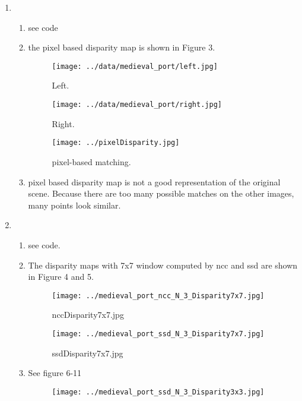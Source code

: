 \documentclass[a4paper, twoside, english]{article}
\begin{document}
\begin{enumerate}
	\item 
	\begin{enumerate}
		\item see code
		\item the pixel based disparity map is shown in Figure 3.
			\begin{figure}[h!]
			\begin{minipage}[b]{0.3\textwidth}
				\texttt{[image: ../data/medieval\_port/left.jpg]}
				\caption{Left.}
			\end{minipage}
			\hfill
			\begin{minipage}[b]{0.3\textwidth}
				\texttt{[image: ../data/medieval\_port/right.jpg]}
				\caption{Right.}
			\end{minipage}
			\hfill
			\begin{minipage}[b]{0.3\textwidth}
				\texttt{[image: ../pixelDisparity.jpg]}
				\caption{pixel-based matching.}
			\end{minipage}
			\hfill
		\end{figure}
		\item pixel based disparity map is not a good representation of the original scene. Because there are too many possible matches on the other images, many points look similar.
	\end{enumerate}
	\item 
	\begin{enumerate}
		\item see code.
		\item The disparity maps with 7x7 window computed by ncc and ssd are shown in Figure 4 and 5. 
		\begin{figure}[h!]
			\begin{minipage}[b]{0.45\textwidth}
				\texttt{[image: ../medieval\_port\_ncc\_N\_3\_Disparity7x7.jpg]}
				\caption{nccDisparity7x7.jpg}
			\end{minipage}
			\hfill
			\begin{minipage}[b]{0.45\textwidth}
				\texttt{[image: ../medieval\_port\_ssd\_N\_3\_Disparity7x7.jpg]}
				\caption{ssdDisparity7x7.jpg}
			\end{minipage}
			\hfill
		\end{figure}
		\item See figure 6-11
		\begin{figure}[h!]
			\begin{minipage}[b]{0.3\textwidth}
				\texttt{[image: ../medieval\_port\_ssd\_N\_3\_Disparity3x3.jpg]}

\end{minipage}
\end{figure}
\end{enumerate}
\end{enumerate}
\end{document}

